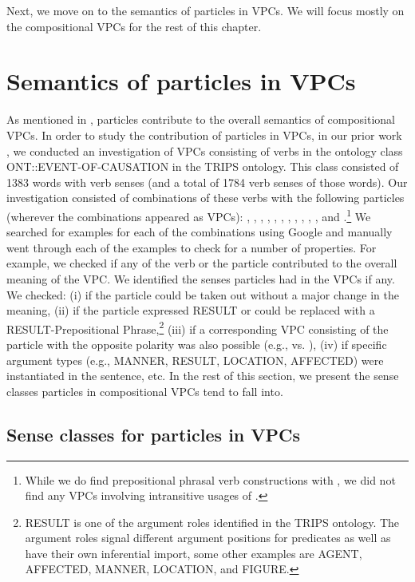 \documentclass[output=paper
,modfonts
,nonflat]{langsci/langscibook}
\begin{document}
Next, we move on to the semantics of particles in VPCs. We will focus mostly on the compositional VPCs for the rest of this chapter. 

\section{Semantics of particles in VPCs} \label{sec:prtcl-semcs}

As mentioned in , particles contribute to the overall semantics of compositional VPCs. In order to study the contribution of particles in VPCs, in our prior work \citep{Bha17}, we conducted an investigation of VPCs consisting of verbs in the ontology class ONT::EVENT-OF-CAUSATION in the TRIPS ontology. This class consisted of 1383 words with verb senses (and a total of 1784 verb senses of those words). Our investigation consisted of combinations of these verbs with the following particles (wherever the combinations %
appeared as VPCs): , , , , , , , , , , , and .\footnote{While we do find prepositional phrasal verb constructions with , we did not find any VPCs involving intransitive usages of .} We searched for examples for each of the combinations using Google and manually went through each of the examples to check for a number of properties. For example, we checked if any of the verb or the particle contributed to the overall meaning of the VPC. We identified the senses particles had in the VPCs if any. We checked: (i) if the particle could be taken out without a major change in the meaning, (ii) if the particle expressed RESULT or could be replaced with a RESULT-Prepositional Phrase,\footnote{RESULT is one of the argument roles identified in the TRIPS ontology. The argument roles signal different argument positions for predicates as well as have their own inferential import, some other examples are AGENT, AFFECTED, MANNER, LOCATION, and FIGURE.} (iii) if a corresponding VPC consisting of the particle with the opposite polarity was also possible (e.g.,  vs. ), (iv) if specific argument types (e.g., MANNER, RESULT, LOCATION, AFFECTED) were instantiated in the sentence, etc. In the rest of this section, we present the sense classes particles in compositional VPCs tend to fall into. 

\subsection{Sense classes for particles in VPCs} \label{sec:senses}
\end{document}
